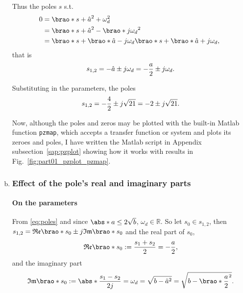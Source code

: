 \documentclass[12pt]{article}
\DeclarePairedDelimiter\brao()%
\DeclarePairedDelimiter\abs||
\begin{document}
\begin{enumerate}[(a)]
        Thus the poles $s$ s.t.
        \begin{equation}
            \begin{aligned}
                0 &{}= \brao*{s + \hat{a}}^2 + \omega_d^2
            \\*
                  &{}= \brao*{s + \hat{a}}^2 - \brao*{j\omega_d}^2
            \\*
                  &{}= \brao*{s + \brao*{\hat{a} - j\omega_d}}\brao*{s + \brao*{\hat{a} + j\omega_d}},
            \\*
            \end{aligned}
        \end{equation}
        that is
        \begin{equation}\label{eq:poles}
            \begin{aligned}
                s_{1,2} = -\hat{a} \pm j\omega_d
                = -\frac{a}2 \pm j\omega_d
                \rlap.
            \end{aligned}
        \end{equation}

        Substituting in the parameters, the poles
        \begin{equation}
            s_{1,2} = -\frac42 \pm j\sqrt{21} = -2 \pm j\sqrt{21}\rlap.
        \end{equation}

        Now, although the poles and zeros may be plotted with the built-in Matlab function \texttt{pzmap}, which accepts a transfer function or system and plots its zeroes and poles,
        I have written the Matlab script in Appendix subsection~\ref{sap:pzplot} showing how it works with results in Fig.~\ref{fig:part01_pzplot_pzmap}.

    \item
        \subsubsection{Effect of the pole's real and imaginary parts}
        \paragraph{On the parameters}
        From \eqref{eq:poles} and since $\abs*{a} \leq 2\sqrt{b}$, $\omega_d\in\mathbb{R}$. So let $s_0\in s_{1,2}$, then $s_{1,2} = \mathfrak{Re}\brao*{s_0} \pm j\mathfrak{Im}\brao*{s_0}$ and
        the real part of $s_0$,
        \begin{equation}\label{eq:Re(s0)}
            \mathfrak{Re}\brao*{s_0} := \frac{s_1 + s_2}2
            = -\frac{a}2\rlap,
        \end{equation}
        and the imaginary part
        \begin{equation}\label{eq:Im(s0)}
            \mathfrak{Im}\brao*{s_0} := \abs*{\frac{s_1 - s_2}{2j}} = \omega_d = \sqrt{b - \hat{a}^2} = \sqrt{b - \brao*{\frac{a}2}^2}\rlap.
        \end{equation}


\end{enumerate}
\end{document}
